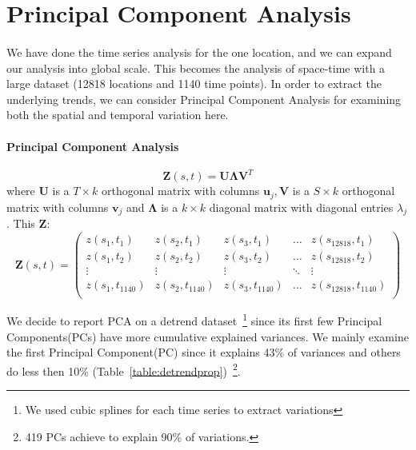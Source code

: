 \documentclass[11pt]{article}
\begin{document}
\section{Principal Component Analysis}
\paragraph{} 
We have done the time series analysis for the one location, and we can expand our analysis into global scale. This becomes the analysis of space-time with a large dataset (12818 locations and 1140 time points). In order to extract the underlying trends, we can consider Principal Component Analysis for examining both the spatial and temporal variation here. 

\paragraph{Principal Component Analysis}
\begin{equation}
\mathbf{Z}(s,t) = \mathbf{U}\mathbf{\Lambda}\mathbf{V}^T
\end{equation}
where $\mathbf{U}$ is a $T \times k$ orthogonal matrix with columns $\mathbf{u}_j, \mathbf{V}$ is a $S \times k$ orthogonal matrix with columns $\mathbf{v}_j$ and $\mathbf{\Lambda}$ is a $k \times k$ diagonal matrix with diagonal entries $\lambda_j$. This $\mathbf{Z}$: 
\begin{equation}
\mathbf{Z}(s,t)  = \begin{pmatrix}
z(s_1, t_1) & z(s_2, t_1) & z(s_3, t_1) & \dots & z(s_{12818}, t_1) \\
z(s_1, t_2) & z(s_2, t_2) & z(s_3, t_2) & \dots & z(s_{12818}, t_2) \\
\vdots & \vdots & \vdots & \ddots & \vdots\\
z(s_1, t_{1140}) & z(s_2, t_{1140}) & z(s_3, t_{1140}) & \dots & z(s_{12818}, t_{1140})\\ 
\end{pmatrix}
\end{equation}

We decide to report PCA on a detrend dataset~\footnote{We used cubic splines for each time series to extract variations} since its first few Principal Components(PCs) have more cumulative explained variances. We mainly examine the first Principal Component(PC) since it explains 43\% of variances and others do less then 10\% (Table~\ref{table:detrendprop})~\footnote{419 PCs achieve to explain 90\% of variations.}.

\end{document}
